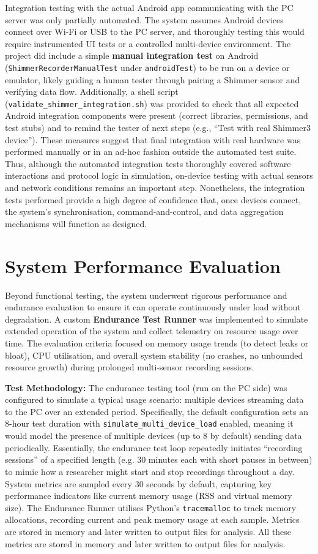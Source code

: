 Integration testing with the actual Android app communicating with the PC server was only partially automated. The system assumes Android devices connect over Wi-Fi or USB to the PC server, and thoroughly testing this would require instrumented UI tests or a controlled multi-device environment. The project did include a simple \textbf{manual integration test} on Android (\texttt{ShimmerRecorderManualTest} under \texttt{androidTest}) to be run on a device or emulator, likely guiding a human tester through pairing a Shimmer sensor and verifying data flow. Additionally, a shell script (\texttt{validate\_shimmer\_integration.sh}) was provided to check that all expected Android integration components were present (correct libraries, permissions, and test stubs) and to remind the tester of next steps (e.g., ``Test with real Shimmer3 device''). These measures suggest that final integration with real hardware was performed manually or in an ad-hoc fashion outside the automated test suite. Thus, although the automated integration tests thoroughly covered software interactions and protocol logic in simulation, on-device testing with actual sensors and network conditions remains an important step. Nonetheless, the integration tests performed provide a high degree of confidence that, once devices connect, the system's synchronisation, command-and-control, and data aggregation mechanisms will function as designed.


\section{System Performance Evaluation}
Beyond functional testing, the system underwent rigorous performance and endurance evaluation to ensure it can operate continuously under load without degradation. A custom \textbf{Endurance Test Runner} was implemented to simulate extended operation of the system and collect telemetry on resource usage over time. The evaluation criteria focused on memory usage trends (to detect leaks or bloat), CPU utilisation, and overall system stability (no crashes, no unbounded resource growth) during prolonged multi-sensor recording sessions.

\textbf{Test Methodology:} The endurance testing tool (run on the PC side) was configured to simulate a typical usage scenario: multiple devices streaming data to the PC over an extended period. Specifically, the default configuration sets an 8-hour test duration with \texttt{simulate\_multi\_device\_load} enabled, meaning it would model the presence of multiple devices (up to 8 by default) sending data periodically. Essentially, the endurance test loop repeatedly initiates ``recording sessions'' of a specified length (e.g. 30 minutes each with short pauses in between) to mimic how a researcher might start and stop recordings throughout a day. System metrics are sampled every 30 seconds by default, capturing key performance indicators like current memory usage (RSS and virtual memory size). The Endurance Runner utilises Python's \texttt{tracemalloc} to track memory allocations, recording current and peak memory usage at each sample. Metrics are stored in memory and later written to output files for analysis. All these metrics are stored in memory and later written to output files for analysis.

